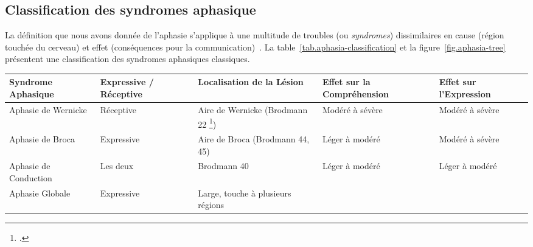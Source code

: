 \subsection{Classification des syndromes aphasique}

La définition que nous avons donnée de l'aphasie s'applique à une multitude de troubles
(ou \emph{syndromes}) dissimilaires en cause (région touchée du cerveau) 
et effet (conséquences pour la communication)~\cite{Hallowell_2017}.
La table~\ref{tab.aphasia-classification} 
et la figure~\ref{fig.aphasia-tree}
présentent une classification des syndromes aphasiques classiques.
\begin{table}[ht]
    \centering
    \begin{adjustbox}{max width=15cm}
        \begin{tabular}{|p{3cm}|p{3cm}|p{3cm}|p{3cm}|p{3cm}|}
        \hline
        Syndrome Aphasique                                      & 
        Expressive / Réceptive                                  & 
        Localisation de la Lésion                               & 
        Effet sur la Compréhension                              & 
        Effet sur l'Expression                                  \\
        \hline
        Aphasie de Wernicke                                     & 
        Réceptive                                               & 
        Aire de Wernicke (Brodmann 22 \footcite{Brodmann_2007}) &
        Modéré à sévère                                         & 
        Modéré à sévère                                         \\
        \hline
        Aphasie de Broca                                        &
        Expressive                                              &
        Aire de Broca (Brodmann 44, 45)                         &
        Léger à modéré                                          &
        Modéré à sévère                                         \\
        \hline
        Aphasie de Conduction                                   &
        Les deux                                                &
        Brodmann 40                                             &
        Léger à modéré                                          &
        Léger à modéré                                          \\
        \hline
        Aphasie Globale                                         &
        Expressive                                              &
        Large, touche à plusieurs régions                       &

\end{tabular}
\end{adjustbox}
\end{table}
